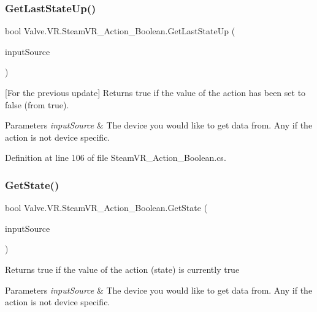 \subsubsection{\texorpdfstring{GetLastStateUp()}{GetLastStateUp()}}
{\footnotesize\ttfamily bool Valve.\+V\+R.\+Steam\+V\+R\+\_\+\+Action\+\_\+\+Boolean.\+Get\+Last\+State\+Up (\begin{DoxyParamCaption}\item[{\mbox{\hyperlink{namespace_valve_1_1_v_r_a82e5bf501cc3aa155444ee3f0662853f}{Steam\+V\+R\+\_\+\+Input\+\_\+\+Sources}}}]{input\+Source }\end{DoxyParamCaption})}



\mbox{[}For the previous update\mbox{]} Returns true if the value of the action has been set to false (from true). 


\begin{DoxyParams}{Parameters}
{\em input\+Source} & The device you would like to get data from. Any if the action is not device specific.\\
\hline
\end{DoxyParams}


Definition at line 106 of file Steam\+V\+R\+\_\+\+Action\+\_\+\+Boolean.\+cs.

\mbox{\label{class_valve_1_1_v_r_1_1_steam_v_r___action___boolean_a189859c4e3670a461d15e63e9fca059b}} 
\subsubsection{\texorpdfstring{GetState()}{GetState()}}
{\footnotesize\ttfamily bool Valve.\+V\+R.\+Steam\+V\+R\+\_\+\+Action\+\_\+\+Boolean.\+Get\+State (\begin{DoxyParamCaption}\item[{\mbox{\hyperlink{namespace_valve_1_1_v_r_a82e5bf501cc3aa155444ee3f0662853f}{Steam\+V\+R\+\_\+\+Input\+\_\+\+Sources}}}]{input\+Source }\end{DoxyParamCaption})}



Returns true if the value of the action (state) is currently true 


\begin{DoxyParams}{Parameters}
{\em input\+Source} & The device you would like to get data from. Any if the action is not device specific.\\
\hline
\end{DoxyParams}


